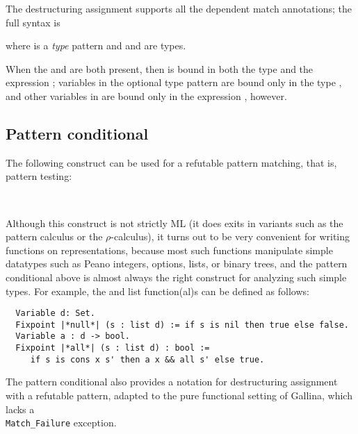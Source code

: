 The \ssr{} destructuring assignment supports all the dependent match
annotations; the  full syntax is

\begin{center}
      \ssrC{:=}     
\end{center}

where  is a \emph{type} pattern and  and
 are types.

When the  and  are both present, then  is bound
in both the type  and the expression ;
variables in the optional type pattern  are
bound only in the type , and other variables in  are
bound only in the expression , however.

\subsection{Pattern conditional}\label{ssec:patcond}
The following construct can be used for a refutable pattern matching,
that is, pattern testing:

\begin{center}
\       
\end{center}

Although this construct is not strictly ML (it does exits in variants
such as the pattern calculus or the $\rho$-calculus), it turns out to be
very convenient for writing functions on representations,
because most such functions manipulate simple datatypes such as Peano
integers, options,
lists, or binary trees, and the pattern conditional above is almost
always the right construct
for analyzing such simple types. For example, the  and
 list function(al)s can be defined as follows:
\begin{lstlisting}
  Variable d: Set.
  Fixpoint |*null*| (s : list d) := if s is nil then true else false.
  Variable a : d -> bool.
  Fixpoint |*all*| (s : list d) : bool :=
     if s is cons x s' then a x && all s' else true.
\end{lstlisting}

The pattern conditional also provides a notation for destructuring
assignment with a refutable pattern, adapted to the pure functional
setting of Gallina, which lacks a \\\texttt{Match\_Failure} exception.

